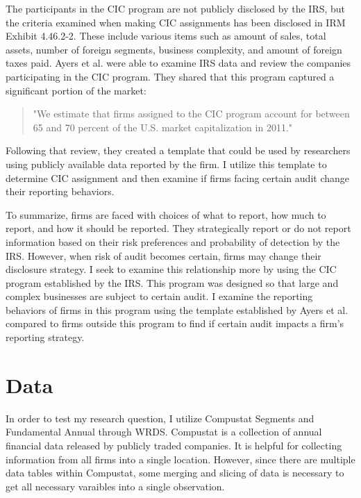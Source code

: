 \documentclass[12pt]{article}
\begin{document}
\vspace{\baselineskip}

The participants in the CIC program are not publicly disclosed by the IRS, but the criteria examined when making CIC assignments has been disclosed in IRM Exhibit 4.46.2-2. These include various items such as amount of sales, total assets, number of foreign segments, business complexity, and amount of foreign taxes paid. Ayers et al. were able to examine IRS data and review the companies participating in the CIC program. They shared that this program captured a significant portion of the market:
\begin{quote} "We estimate that firms assigned to the CIC program account for between 65 and 70 percent of the U.S. market capitalization in 2011." \citep{Ayers2019}
\end{quote}
Following that review, they created a template that could be used by researchers using publicly available data reported by the firm.\citep{Ayers2019} I utilize this template to determine CIC assignment and then examine if firms facing certain audit change their reporting behaviors.
\vspace{\baselineskip}

To summarize, firms are faced with choices of what to report, how much to report, and how it should be reported. They strategically report or do not report information based on their risk preferences and probability of detection by the IRS. However, when risk of audit becomes certain, firms may change their disclosure strategy. I seek to examine this relationship more by using the CIC program established by the IRS. This program was designed so that large and complex businesses are subject to certain audit. I examine the reporting behaviors of firms in this program using the template established by Ayers et al. compared to firms outside this program to find if certain audit impacts a firm's reporting strategy.

\section{Data}
In order to test my research question, I utilize Compustat Segments and Fundamental Annual through WRDS. Compustat is a collection of annual financial data released by publicly traded companies. It is helpful for collecting information from all firms into a single location. However, since there are multiple data tables within Compustat, some merging and slicing of data is necessary to get all necessary varaibles into a single observation.
\vspace{\baselineskip}
\end{document}
